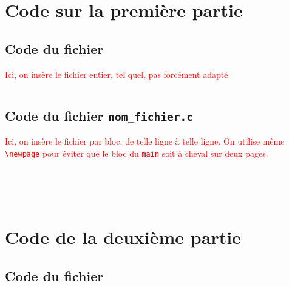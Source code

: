 \documentclass[12pt,a4paper,fleqn]{article}
\begin{document}
\pagestyle{fancy} %




\newpage
\section{Code sur la première partie}

\subsection{Code du fichier }
\textcolor{red}{Ici, on insère le fichier entier, tel quel, pas forcément adapté.}
\inputminted{c}{code/triangle.c}

\subsection{Code du fichier \texorpdfstring{\texttt{nom_fichier.c}}{nom\_fichier.c}}
\textcolor{red}{
Ici, on insère le fichier par bloc, de telle ligne à telle ligne. 
On utilise même \texttt{\textbackslash newpage} pour éviter que le bloc du \texttt{main} soit à cheval sur deux pages.}

\inputminted[firstline=1,lastline=20]{c}{code/triangle.c}
\inputminted[firstline=25,lastline=27]{c}{code/triangle.c}
\inputminted[firstline=35,lastline=37]{c}{code/triangle.c}
\inputminted[firstline=55,lastline=102]{c}{code/triangle.c}
\newpage
\inputminted[firstline=105,lastline=148]{c}{code/triangle.c}

\newpage
\section{Code de la deuxième partie}

\subsection{Code du fichier }
\inputminted{ocaml}{code/oppose.ml}
\end{document}
